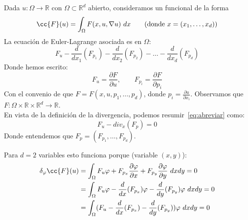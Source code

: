 \noindent
Dada $u:\Omega\to \mathbb{R}$ con $\Omega\subset \mathbb{R}^d$ abierto, consideramos un funcional de la forma
\begin{equation*}
    \cc{F}(u) = \int_\Omega F(x,u,\nabla u)~dx \qquad (\text{donde\ } x=(x_1,\ldots,x_d))
\end{equation*}
La ecuación de Euler-Lagrange asociada es en $\Omega$:
\begin{equation}\label{eq:abreviar}
    F_u - \frac{d}{dx_1}(F_{p_1}) - \frac{d}{dx_2}(F_{p_2}) - \ldots - \frac{d}{dx_d}(F_{p_d})
\end{equation}
Donde hemos escrito:
\begin{equation*}
    F_u = \frac{\partial F}{\partial u}, \qquad F_{p_i} = \frac{\partial F}{\partial p_i} 
\end{equation*}
Con el convenio de que $F=F(x,u,p_1,\ldots,p_d)$, donde $p_i = \frac{\partial u}{\partial x_i}$. Observamos que $F:\Omega\times\mathbb{R}\times\mathbb{R}^d\to \mathbb{R}$.\\

\noindent
En vista de la definición de la divergencia, podemos resumir~\eqref{eq:abreviar} como:
\begin{equation*}
    F_u - div_x(F_p) = 0
\end{equation*}
Donde entendemos que $F_p = (F_{p_1}, \ldots, F_{p_d})$.

\noindent
Para $d=2$ variables esto funciona porque (variable $(x,y)$):
\begin{align*}
    \delta_\varphi \cc{F}(u) &= \int_\Omega F_u\varphi + F_{p_x}\frac{\partial \varphi}{\partial x} + F_{p_y} \frac{\partial \varphi}{\partial y}~dxdy = 0 \\
                             &= \int_\Omega F_u\varphi - \frac{d}{dx}(F_{p_x})\varphi - \frac{d}{dy}(F_{p_y})\varphi~dxdy = 0 \\
                             &= \int_\Omega(F_u - \frac{d}{dx}(F_{p_x}) - \frac{d}{dy}(F_{p_y}))\varphi~dxdy = 0
\end{align*}

